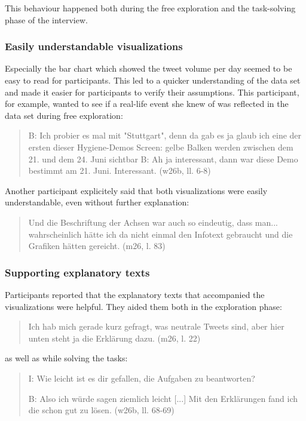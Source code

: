 This behaviour happened both during the free exploration and the task-solving phase of the interview.

\subsubsection*{Easily understandable visualizations}
Especially the bar chart which showed the tweet volume per day seemed to be easy to read for participants. This led to a quicker understanding of the data set and made it easier for participants to verify their assumptions. This participant, for example, wanted to see if a real-life event she knew of was reflected in the data set during free exploration:

\begin{quote}
    B: Ich probier es mal mit "Stuttgart", denn da gab es ja glaub ich eine der ersten dieser Hygiene-Demos
    Screen: gelbe Balken werden zwischen dem 21. und dem 24. Juni sichtbar
    B: Ah ja interessant, dann war diese Demo bestimmt am 21. Juni. Interessant. (w26b, ll. 6-8)
\end{quote}

Another participant explicitely said that both visualizations were easily understandable, even without further explanation:

\begin{quote}
    Und die Beschriftung der Achsen war auch so eindeutig, dass man... wahrscheinlich hätte ich da nicht einmal den Infotext gebraucht und die Grafiken hätten gereicht. (m26, l. 83)
\end{quote}

\subsubsection*{Supporting explanatory texts}
Participants reported that the explanatory texts that accompanied the visualizations were helpful. They aided them both in the exploration phase:

\begin{quote}
    Ich hab mich gerade kurz gefragt, was neutrale Tweets sind, aber hier unten steht ja die Erklärung dazu. (m26, l. 22)
\end{quote}

as well as while solving the tasks:

\begin{quote}
    I: Wie leicht ist es dir gefallen, die Aufgaben zu beantworten?

    B: Also ich würde sagen ziemlich leicht [...] Mit den Erklärungen fand ich die schon gut zu lösen. (w26b, ll. 68-69)
\end{quote}

